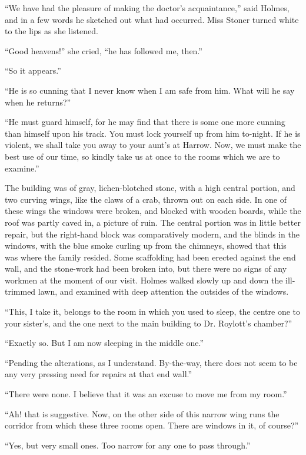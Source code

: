“We have had the pleasure of making the doctor’s acquaintance,”
said Holmes, and in a few words he sketched out what
had occurred. Miss Stoner turned white to the lips as she
listened.

“Good heavens!” she cried, “he has followed me, then.”

“So it appears.”

“He is so cunning that I never know when I am safe from
him. What will he say when he returns?”

“He must guard himself, for he may find that there is some
one more cunning than himself upon his track. You must
lock yourself up from him to-night. If he is violent, we shall
take you away to your aunt’s at Harrow. Now, we must make
the best use of our time, so kindly take us at once to the rooms
which we are to examine.”

The building was of gray, lichen-blotched stone, with a high
central portion, and two curving wings, like the claws of a
crab, thrown out on each side. In one of these wings the
windows were broken, and blocked with wooden boards, while
the roof was partly caved in, a picture of ruin. The central
portion was in little better repair, but the right-hand block
was comparatively modern, and the blinds in the windows,
with the blue smoke curling up from the chimneys, showed
that this was where the family resided. Some scaffolding had
been erected against the end wall, and the stone-work had
been broken into, but there were no signs of any workmen at
the moment of our visit. Holmes walked slowly up and down
the ill-trimmed lawn, and examined with deep attention the
outsides of the windows.

“This, I take it, belongs to the room in which you used to
sleep, the centre one to your sister’s, and the one next to the
main building to Dr. Roylott’s chamber?”

“Exactly so. But I am now sleeping in the middle one.”

“Pending the alterations, as I understand. By-the-way,
there does not seem to be any very pressing need for repairs
at that end wall.”

“There were none. I believe that it was an excuse to move
me from my room.”

“Ah! that is suggestive. Now, on the other side of this
narrow wing runs the corridor from which these three rooms
open. There are windows in it, of course?”

“Yes, but very small ones. Too narrow for any one to pass
through.”

